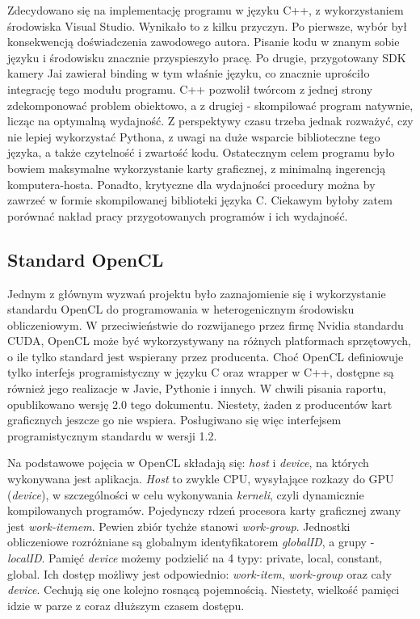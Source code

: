 Zdecydowano się na implementację programu w języku C++, z wykorzystaniem środowiska Visual Studio. Wynikało to z kilku przyczyn. Po pierwsze, wybór był konsekwencją doświadczenia zawodowego autora. Pisanie kodu w znanym sobie języku i środowisku znacznie przyspieszyło pracę. Po drugie, przygotowany SDK kamery Jai zawierał binding w tym właśnie języku, co znacznie uprościło integrację tego modułu programu. C++ pozwolił twórcom z jednej strony zdekomponować problem obiektowo, a z drugiej - skompilować program natywnie, licząc na optymalną wydajność. Z perspektywy czasu trzeba jednak rozważyć, czy nie lepiej wykorzystać Pythona, z uwagi na duże wsparcie biblioteczne tego języka, a także czytelność i zwartość kodu. Ostatecznym celem programu było bowiem maksymalne wykorzystanie karty graficznej, z minimalną ingerencją komputera-hosta. Ponadto, krytyczne dla wydajności procedury można by zawrzeć w formie skompilowanej biblioteki języka C. Ciekawym byłoby zatem porównać nakład pracy przygotowanych programów i ich wydajność.

\subsection{Standard OpenCL}
Jednym z głównym wyzwań projektu było zaznajomienie się i wykorzystanie standardu OpenCL \cite{OpenCL} do programowania w heterogenicznym środowisku obliczeniowym. W przeciwieństwie do rozwijanego przez firmę Nvidia standardu CUDA, OpenCL może być wykorzystywany na różnych platformach sprzętowych, o ile tylko standard jest wspierany przez producenta. Choć OpenCL definiowuje tylko interfejs programistyczny w języku C oraz wrapper w C++, dostępne są również jego realizacje w Javie, Pythonie i innych. W chwili pisania raportu, opublikowano wersję 2.0 tego dokumentu. Niestety, żaden z producentów kart graficznych jeszcze go nie wspiera. Posługiwano się więc interfejsem programistycznym standardu w wersji 1.2.

Na podstawowe pojęcia w OpenCL składają się: \textit{host} i \textit{device}, na których wykonywana jest aplikacja. \textit{Host} to zwykle CPU, wysyłające rozkazy do GPU (\textit{device}), w szczególności w celu wykonywania \textit{kerneli}, czyli dynamicznie kompilowanych programów. Pojedynczy rdzeń procesora karty graficznej zwany jest \textit{work-itemem}. Pewien zbiór tychże stanowi \textit{work-group}. Jednostki obliczeniowe rozróżniane są globalnym identyfikatorem \textit{globalID}, a grupy - \textit{localID}. 
Pamięć \textit{device} możemy podzielić na 4 typy: private, local, constant, global. Ich dostęp możliwy jest odpowiednio: \textit{work-item}, \textit{work-group} oraz cały \textit{device}. Cechują się one kolejno rosnącą pojemnością. Niestety, wielkość pamięci idzie w parze z coraz dłuższym czasem dostępu.


